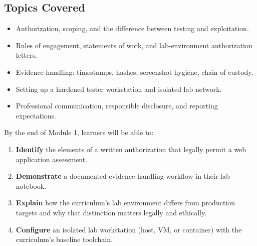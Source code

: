 \documentclass[11pt,letterpaper,oneside]{report}
\begin{document}
\subsection*{Topics Covered}
\begin{itemize}
  \item Authorization, scoping, and the difference between testing and exploitation.
  \item Rules of engagement, statements of work, and lab-environment authorization letters.
  \item Evidence handling: timestamps, hashes, screenshot hygiene, chain of custody.
  \item Setting up a hardened tester workstation and isolated lab network.
  \item Professional communication, responsible disclosure, and reporting expectations.
\end{itemize}

\begin{outcomes}
By the end of Module 1, learners will be able to:
\begin{enumerate}
  \item \textbf{Identify} the elements of a written authorization that legally permit a web application assessment.
  \item \textbf{Demonstrate} a documented evidence-handling workflow in their lab notebook.
  \item \textbf{Explain} how the curriculum's lab environment differs from production targets and why that distinction matters legally and ethically.
  \item \textbf{Configure} an isolated lab workstation (host, VM, or container) with the curriculum's baseline toolchain.
\end{enumerate}
\end{outcomes}
\end{document}
